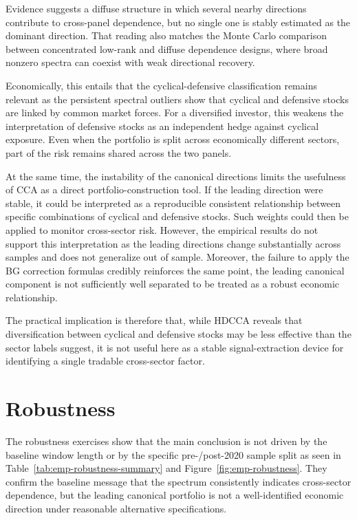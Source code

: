 \documentclass[12pt]{report} %
\begin{document}
Evidence suggests a diffuse structure in which several nearby directions contribute to cross-panel 
dependence, but no single one is stably estimated as the dominant direction. That reading also matches the 
Monte Carlo comparison between concentrated low-rank and diffuse dependence designs, where broad nonzero 
spectra can coexist with weak directional recovery.

Economically, this entails that the cyclical-defensive classification remains relevant as
the persistent spectral outliers show that cyclical and defensive stocks are linked by 
common market forces. For a diversified investor, this weakens the interpretation of 
defensive stocks as an independent hedge against cyclical exposure. 
Even when the portfolio is split across economically different sectors, part of the risk 
remains shared across the two panels.

At the same time, the instability of the canonical directions limits the usefulness of CCA 
as a direct portfolio-construction tool. If the leading direction were stable, it could be 
interpreted as a reproducible consistent relationship between specific combinations of 
cyclical and defensive stocks. Such weights could then be applied to monitor cross-sector 
risk. However, the empirical results do not support this 
interpretation as the leading directions change substantially 
across samples and does not generalize out of sample. Moreover, the failure to apply the 
BG correction formulas credibly reinforces the same point, the leading canonical component is 
not sufficiently well separated to be treated as a robust economic relationship.

The practical implication is therefore that, while HDCCA 
reveals that diversification between cyclical and defensive stocks may be 
less effective than the sector labels suggest, it is not useful here as a stable 
signal-extraction device for identifying a single tradable cross-sector factor. 

\section{Robustness}

The robustness exercises show that the main conclusion is not driven by the baseline window length or 
by the specific pre-/post-2020 sample split as seen 
in Table~\ref{tab:emp-robustness-summary} and Figure~\ref{fig:emp-robustness}.
They confirm the baseline message that the spectrum consistently indicates cross-sector 
dependence, but the leading canonical portfolio is not a well-identified economic direction under reasonable 
alternative specifications.
\end{document}
